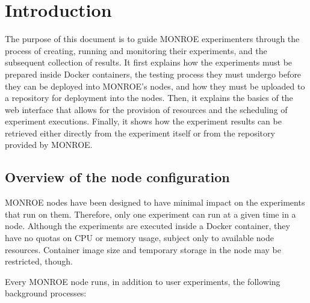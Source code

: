 \documentclass[a4paper,10pt]{article}
\newcommand{\monroe}{MONROE}
\begin{document}

\section{Introduction}
\label{sec:intro}

The purpose of this document is to guide \monroe{} experimenters through the process of creating, running and monitoring their experiments, and the subsequent collection of results.
It first explains how the experiments must be prepared inside Docker containers, the testing process they must undergo before they can be deployed into \monroe{}'s nodes, and how they must be uploaded to a repository for deployment into the nodes.
Then, it explains the basics of the web interface that allows for the provision of resources and the scheduling of experiment executions.
Finally, it shows how the experiment results can be retrieved either directly from the experiment itself or from the repository provided by \monroe{}.

\subsection{Overview of the node configuration}

\monroe{} nodes have been designed to have minimal impact on the experiments that run on them.
Therefore, only one experiment can run at a given time in a node.
Although the experiments are executed inside a Docker container, they have no quotas on CPU or memory usage, subject only to available node resources.
Container image size and temporary storage in the node may be restricted, though.

Every \monroe{} node runs, in addition to user experiments, the following background processes:
\end{document}
